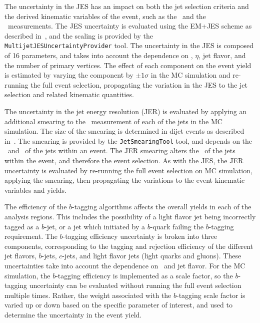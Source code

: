The uncertainty in the JES has an impact on both the jet
selection criteria and the derived kinematic variables of the event, such as
the \HT\ and the \MET\ measurements.
The JES uncertainty is evaluated using the EM+JES scheme as described
in~\cite{JES}, and the scaling is provided by the
\texttt{MultijetJESUncertaintyProvider} tool.
The uncertainty in the JES is composed of 16 parameters, and takes into account
the dependence on \pt, $\eta$, jet flavor, and the number of primary vertices.
The effect of each component on the event yield is estimated by varying the
component by $\pm 1 \sigma$ in the MC simulation and re-running the full event
selection, propagating the variation in the JES to the jet selection and related
kinematic quantities.

The uncertainty in the jet energy resolution (JER) is evaluated by applying an
additional smearing to the \pt\ measurement of each of the jets in the MC
simulation.
The size of the smearing is determined in dijet events as described
in~\cite{JER}.
The smearing is provided by the \texttt{JetSmearingTool} tool, and depends on
the \pt\ and \eta\ of the jets within an event.
The JER smearing alters the \pt\ of the jets within the event, and therefore
the event selection.
As with the JES, the JER uncertainty is evaluated by re-running the full event
selection on MC simulation, applying the smearing, then propagating the
variations to the event kinematic variables and yields.

The efficiency of the $b$-tagging
algorithms affects the overall yields in each of the analysis regions.
This includes the possibility of a light flavor jet being incorrectly tagged
as a $b$-jet, or a jet which initiated by a $b$-quark failing the $b$-tagging
requirement.
The $b$-tagging efficiency uncertainty is broken into three components,
corresponding to the tagging and rejection efficiency of the different jet
flavors, $b$-jets, $c$-jets, and light flavor jets (light quarks and gluons).
These uncertainties take into account the dependence on \pt\ and jet flavor.
For the MC simulation, the $b$-tagging efficiency is implemented as a scale
factor, so the $b$-tagging uncertainty can be evaluated without running the
full event selection multiple times.
Rather, the weight associated with the $b$-tagging scale factor is varied up or
down based on the specific parameter of interest, and used to determine the
uncertainty in the event yield.

